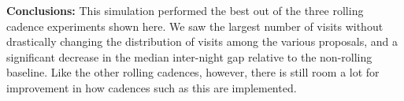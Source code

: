 \documentclass[DM,authoryear,toc]{lsstdoc}
\begin{document}
\textbf{Conclusions:} This simulation performed the best out of the three rolling cadence experiments shown here. We saw the
largest number of visits without drastically changing the distribution of visits among the various proposals, and a
significant decrease in the median inter-night gap relative to the non-rolling baseline. Like the other rolling cadences, however,
there is still room a lot for improvement in how cadences such as this are implemented.


%
\end{document}

